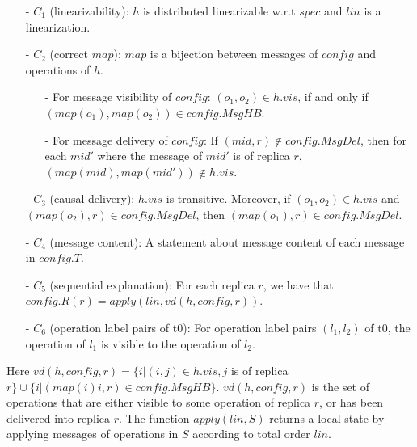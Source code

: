 \begin{itemize}
\setlength{\itemsep}{0.5pt}
\item[-] $C_1$ (linearizability): $h$ is distributed linearizable w.r.t $\mathit{spec}$ and $\mathit{lin}$ is a linearization.

\item[-] $C_2$ (correct $\mathit{map}$): $\mathit{map}$ is a bijection between messages of $\mathit{config}$ and operations of $h$.

    \begin{itemize}
    \setlength{\itemsep}{0.5pt}
    \item[-] For message visibility of $\mathit{config}$: $(o_1,o_2) \in h.\mathit{vis}$, if and only if $(\mathit{map}(o_1),\mathit{map}(o_2)) \in \mathit{config}.\mathit{MsgHB}$.

    \item[-] For message delivery of $\mathit{config}$: If $(\mathit{mid},r) \notin \mathit{config}.\mathit{MsgDel}$, then for each $\mathit{mid}'$ where the message of $\mathit{mid}'$ is of replica $r$, $(\mathit{map}(\mathit{mid}),\mathit{map}(\mathit{mid}')) \notin h.\mathit{vis}$.
    \end{itemize}

\item[-] $C_3$ (causal delivery): $h.\mathit{vis}$ is transitive. Moreover, if $(o_1,o_2) \in h.\mathit{vis}$ and $(\mathit{map}(o_2),r) \in \mathit{config}.\mathit{MsgDel}$, then $(\mathit{map}(o_1),r) \in \mathit{config}.\mathit{MsgDel}$.

\item[-] $C_4$ (message content): A statement about message content of each message in $\mathit{config}.T$.

\item[-] $C_5$ (sequential explanation): For each replica $r$, we have that $\mathit{config}.R(r) = \mathit{apply}(\mathit{lin},\mathit{vd}(h,\mathit{config},r))$. 

\item[-] $C_6$ (operation label pairs of t0): For operation label pairs $(l_1,l_2)$ of t0, the operation of $l_1$ is visible to the operation of $l_2$. 
\end{itemize}

Here $\mathit{vd}(h,\mathit{config},r) = \{ i \vert (i,j) \in h.\mathit{vis}, j$ is of replica $r \} \cup \{ i \vert (\mathit{map}(i)i,r) \in \mathit{config}.\mathit{MsgHB} \}$. $\mathit{vd}(h,\mathit{config},r)$ is the set of operations that are either visible to some operation of replica $r$, or has been delivered into replica $r$. The function $\mathit{apply}(\mathit{lin},S)$ returns a local state by applying messages of operations in $S$ according to total order $\mathit{lin}$.


